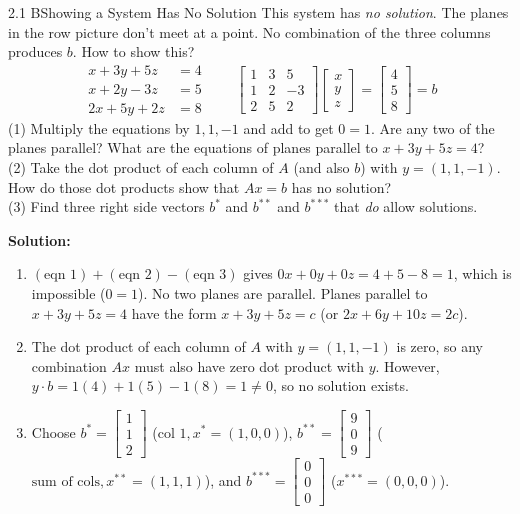 \documentclass[11pt,a4paper,openany,oneside]{book}
\def\vect#1{#1}%
\def\mathbf#1{#1}%
\newcommand{\vect}[1]{\mathbf{#1}}
\numberwithin{equation}{chapter}
\begin{document}
\begin{example}{2.1 B}{Showing a System Has No Solution}
This system has \emph{no solution}. The planes in the row picture don't meet at a point. No combination of the three columns produces $\vect{b}$. How to show this?
\[
\begin{aligned}
x + 3y + 5z &= 4 \\
x + 2y - 3z &= 5 \\
2x + 5y + 2z &= 8
\end{aligned}
\qquad
\begin{bmatrix} 1 & 3 & 5 \\ 1 & 2 & -3 \\ 2 & 5 & 2 \end{bmatrix} \begin{bmatrix} x \\ y \\ z \end{bmatrix} = \begin{bmatrix} 4 \\ 5 \\ 8 \end{bmatrix} = \vect{b}
\]
(1) Multiply the equations by $1, 1, -1$ and add to get $0 = 1$. Are any two of the planes parallel? What are the equations of planes parallel to $x + 3y + 5z = 4$?\\
(2) Take the dot product of each column of $A$ (and also $\vect{b}$) with $\vect{y} = (1, 1, -1)$. How do those dot products show that $A\vect{x} = \vect{b}$ has no solution?\\
(3) Find three right side vectors $\vect{b}^*$ and $\vect{b}^{**}$ and $\vect{b}^{***}$ that \emph{do} allow solutions.
\end{example}
\textbf{Solution:}
\begin{enumerate}
\item[(1)] $(\text{eqn 1}) + (\text{eqn 2}) - (\text{eqn 3})$ gives $0x + 0y + 0z = 4 + 5 - 8 = 1$, which is impossible ($0=1$). No two planes are parallel. Planes parallel to $x+3y+5z=4$ have the form $x+3y+5z=c$ (or $2x+6y+10z=2c$).
\item[(2)] The dot product of each column of $A$ with $\vect{y}=(1,1,-1)$ is zero, so any combination $A\vect{x}$ must also have zero dot product with $\vect{y}$. However, $\vect{y}\cdot\vect{b} = 1(4)+1(5)-1(8) = 1 \neq 0$, so no solution exists.
\item[(3)] Choose $\vect{b}^* = \begin{bmatrix}1\\1\\2\end{bmatrix}$ ($\text{col 1}, \vect{x}^*=(1,0,0)$), $\vect{b}^{**} = \begin{bmatrix}9\\0\\9\end{bmatrix}$ ($\text{sum of cols}, \vect{x}^{**}=(1,1,1)$), and $\vect{b}^{***} = \begin{bmatrix}0\\0\\0\end{bmatrix}$ ($\vect{x}^{***}=(0,0,0)$).
\end{enumerate}
\end{document}

